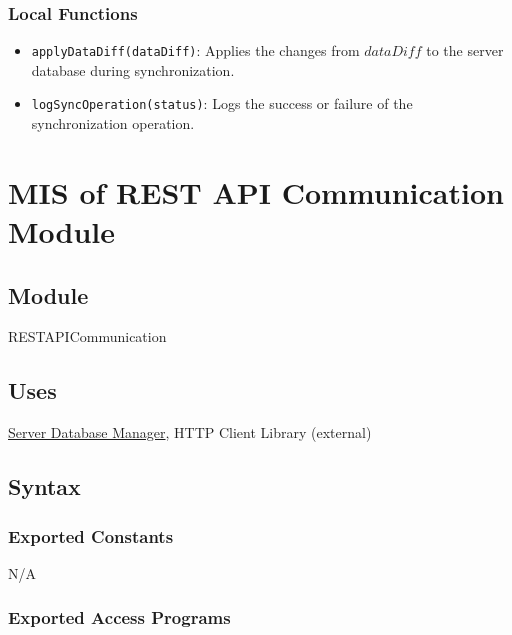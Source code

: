 \documentclass[12pt, titlepage]{article}
\begin{document}
\subsubsection{Local Functions}

\begin{itemize}
  \item \texttt{applyDataDiff(dataDiff)}: Applies the changes from \( dataDiff \) to the server database during synchronization.
  \item \texttt{logSyncOperation(status)}: Logs the success or failure of the synchronization operation.
\end{itemize}

\newpage

\section{MIS of REST API Communication Module} \label{rest-api}

\subsection{Module}

RESTAPICommunication

\subsection{Uses}

\hyperref[server-dbm]{Server Database Manager}, HTTP Client Library (external)

\subsection{Syntax}

\subsubsection{Exported Constants}

N/A

\subsubsection{Exported Access Programs}
\end{document}
